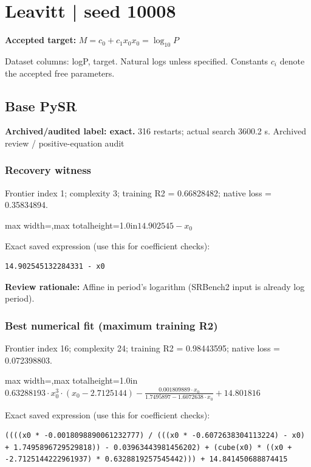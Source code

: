 \documentclass[10pt,letterpaper,landscape]{article}
\begin{document}
\section*{Leavitt | seed 10008}
\textbf{Accepted target:} $\displaystyle M=c_0+c_1x_0$\hfill $x_0=\log_{10}P$\par
{\small Dataset columns: logP, target. Natural logs unless specified. Constants $c_i$ denote the accepted free parameters.}\par\medskip
\begin{minipage}[t]{0.485\textwidth}
\subsection*{Base PySR}
\textbf{Archived/audited label: exact.} 316 restarts; actual search 3600.2 s.
{\small Archived review / positive-equation audit}
\subsubsection*{Recovery witness}
Frontier index 1; complexity 3; training R2 = 0.66828482; native loss = 0.35834894.
\begin{center}\begin{adjustbox}{max width=\linewidth,max totalheight=1.0in}$\displaystyle 14.902545 - x_{0}$\end{adjustbox}\end{center}
{\scriptsize Exact saved expression (use this for coefficient checks):}
\begin{lstlisting}
14.902545132284331 - x0
\end{lstlisting}
{\small\textbf{Review rationale:} Affine in period's logarithm (SRBench2 input is already log period).}
\subsubsection*{Best numerical fit (maximum training R2)}
Frontier index 16; complexity 24; training R2 = 0.98443595; native loss = 0.072398803.
\begin{center}\begin{adjustbox}{max width=\linewidth,max totalheight=1.0in}$\displaystyle 0.63288193 \cdot x_{0}^{3} \cdot \left(x_{0} - 2.7125144\right) - \frac{0.001809889 \cdot x_{0}}{1.7495897 - 1.6072638 \cdot x_{0}} + 14.801816$\end{adjustbox}\end{center}
{\scriptsize Exact saved expression (use this for coefficient checks):}
\begin{lstlisting}
((((x0 * -0.0018098890061232777) / (((x0 * -0.6072638304113224) - x0) + 1.7495896729529818)) - 0.03963443981456202) + (cube(x0) * ((x0 + -2.7125144222961937) * 0.6328819257545442))) + 14.841450688874415
\end{lstlisting}
\end{minipage}\hfill
\end{document}
